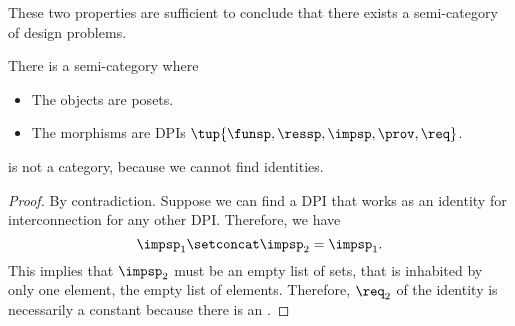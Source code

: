 These two properties are sufficient to conclude that there exists a semi-category of design problems.

\begin{definition}
  \label{def:DPIcat}
  There is a semi-category \DPI where
  \begin{itemize}
    \item The objects are posets.
    \item The morphisms are DPIs $\tup{\funsp,\ressp,\impsp,\prov,\req}$.
  \end{itemize}
\end{definition}

\begin{lemma}
\DPI is not a category, because we cannot find identities.
\end{lemma}
\begin{proof}
By contradiction. Suppose we can find a DPI that works as an identity for interconnection for any other DPI.
Therefore, we have
\begin{equation}
  \impsp_{1} \setconcat \impsp_{2} = \impsp_{1}.
\end{equation}
This implies that $\impsp_{2}$ must be an empty list of sets,  that is inhabited by only one element, the empty list of elements. Therefore, $\req_2$ of the identity is necessarily a constant because there is an .
\end{proof}



